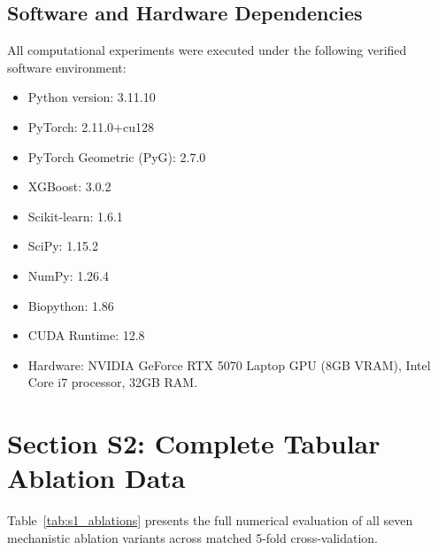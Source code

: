 \documentclass[journal=jcisd8,manuscript=suppinfo]{achemso}
\begin{document}
\subsection{Software and Hardware Dependencies}
All computational experiments were executed under the following verified software environment:
\begin{itemize}
    \item Python version: 3.11.10
    \item PyTorch: 2.11.0+cu128
    \item PyTorch Geometric (PyG): 2.7.0
    \item XGBoost: 3.0.2
    \item Scikit-learn: 1.6.1
    \item SciPy: 1.15.2
    \item NumPy: 1.26.4
    \item Biopython: 1.86
    \item CUDA Runtime: 12.8
    \item Hardware: NVIDIA GeForce RTX 5070 Laptop GPU (8GB VRAM), Intel Core i7 processor, 32GB RAM.
\end{itemize}

\section{Section S2: Complete Tabular Ablation Data}

Table~\ref{tab:s1_ablations} presents the full numerical evaluation of all seven mechanistic ablation variants across matched 5-fold cross-validation.

\begin{table}[htbp]
\centering
\caption{Full Numerical Metrics for Targeted Mechanistic Ablations across Matched 5-Fold Cross-Validation}
\label{tab:s1_ablations}
\end{table}
\end{document}

